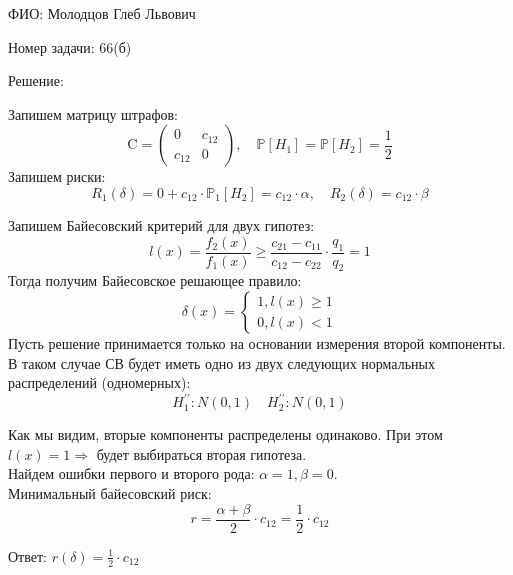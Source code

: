 \documentclass[14pt]{extarticle}
\begin{document}
ФИО: Молодцов Глеб Львович

\vspace{10pt}

Номер задачи: 66(б)

\vspace{10pt}

Решение:

\vspace{10pt}
Запишем матрицу штрафов:
$$
\text{C}=\left(\begin{array}{ll}
0 & c_{12}  \\
c_{12}  & 0
\end{array}\right), \quad \mathbb{P}\left[H_1\right]=\mathbb{P}\left[H_2\right]=\frac{1}{2}
$$
Запишем риски:
$$
R_1(\delta)=0+c_{12}  \cdot \mathbb{P}_1\left[H_2\right]=c_{12} \cdot \alpha, \quad R_2(\delta)=c_{12}  \cdot \beta
$$

Запишем Байесовский критерий для двух гипотез:
$$
l(x)=\frac{f_2(x)}{f_1(x)} \geqslant \frac{c_{21}-c_{11}}{c_{12}-c_{22}} \cdot \frac{q_1}{q_2}=1
$$
Тогда получим Байесовское решающее правило:
$$
\delta(x)=\left\{\begin{array}{l}
1, l(x) \geqslant 1 \\
0, l(x)<1
\end{array}\right.
$$
Пусть решение принимается только на основании измерения второй компоненты. В таком случае СВ будет иметь одно из двух следующих нормальных распределений (одномерных):
$$
H_1^{\prime \prime}: N(0,1) \quad H_2^{\prime \prime}: N(0,1)
$$

Как мы видим, вторые компоненты распределены одинаково.
При этом $l(x) = 1 \Rightarrow$ будет выбираться вторая гипотеза. \\
Найдем ошибки первого и второго рода: 
$\alpha=1, \beta=0$.\\
Минимальный байесовский риск:
$$
r=\frac{\alpha+\beta}{2}\cdot c_{12} =\frac{1}{2} \cdot c_{12} 
$$

Ответ: $r(\delta)= \frac{1}{2} \cdot c_{12} $
\end{document}
